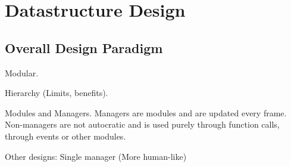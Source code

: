 \chapter{Datastructure Design}

\section{Overall Design Paradigm}

Modular.

Hierarchy (Limits, benefits).

Modules and Managers. Managers are modules and are updated every frame. Non-managers are not autocratic and is used purely through function calls, through events or other modules.

Other designs: Single manager (More human-like)
